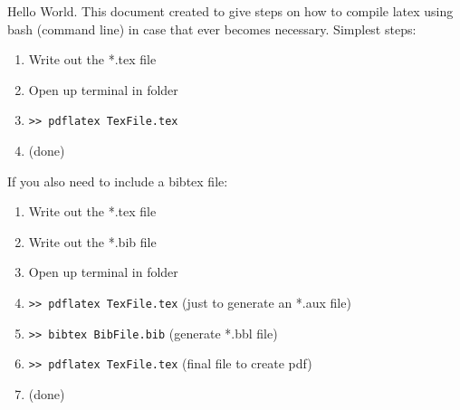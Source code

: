 \documentclass[a4paper,12pt]{article} %
\begin{document}
Hello World. This document created to give steps on how to compile latex using bash (command line) in case that ever becomes necessary. Simplest steps: 

\begin{enumerate}
\itemsep=-0.5em
\item Write out the *.tex file
\item Open up terminal in folder
\item \texttt{>> pdflatex TexFile.tex}
\item (done)
\end{enumerate}


If you also need to include a bibtex file: 

\begin{enumerate}
\itemsep=-0.5em
\item Write out the *.tex file
\item Write out the *.bib file
\item Open up terminal in folder
\item \texttt{>> pdflatex TexFile.tex} (just to generate an *.aux file)
\item \texttt{>> bibtex BibFile.bib} (generate *.bbl file)
\item \texttt{>> pdflatex TexFile.tex} (final file to create pdf)
\item (done)
\end{enumerate}


\nocite{*}


\end{document}

